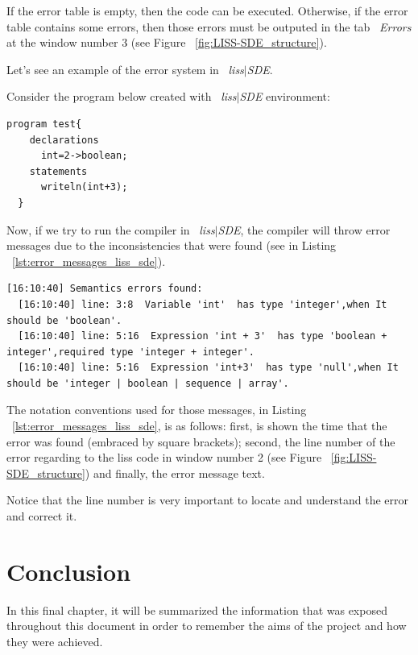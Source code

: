 \documentclass[
  oneside,
  11pt, a4paper,
  footinclude=true,
  headinclude=true,
  cleardoublepage=empty
]{scrbook}
\begin{document}
If the error table is empty, then the code can be executed. Otherwise, if the error table contains some errors, then those errors must be outputed in the tab ~\textit{Errors} at the window number 3 (see Figure ~\ref{fig:LISS-SDE_structure}).

Let's see an example of the error system in ~\textit{liss$|$SDE}.

Consider the program below created with ~\textit{liss$|$SDE} environment:

\begin{lstlisting}[caption={Example of a liss code that isn't semantically correct},label={lst:error_semantic_liss_sde_example}]
  program test{
    declarations
      int=2->boolean;
    statements
      writeln(int+3);
  }
\end{lstlisting}

Now, if we try to run the compiler in ~\textit{liss$|$SDE}, the compiler will throw error messages due to the inconsistencies that were found (see in Listing ~\ref{lst:error_messages_liss_sde}).

\begin{lstlisting}[caption={Error messages in ~\textit{liss$|$SDE}},label={lst:error_messages_liss_sde}]
  [16:10:40] Semantics errors found:
  [16:10:40] line: 3:8  Variable 'int'  has type 'integer',when It should be 'boolean'.
  [16:10:40] line: 5:16  Expression 'int + 3'  has type 'boolean + integer',required type 'integer + integer'.
  [16:10:40] line: 5:16  Expression 'int+3'  has type 'null',when It should be 'integer | boolean | sequence | array'.
\end{lstlisting}
 
The notation conventions used for those messages, in Listing ~\ref{lst:error_messages_liss_sde}, is as follows: first, is shown the time that the error was found (embraced by square brackets); second, the line number of the error regarding to the liss code in window number 2 (see Figure ~\ref{fig:LISS-SDE_structure}) and finally, the error message text.

Notice that the line number is very important to locate and understand the error and correct it.


\chapter{Conclusion}

In this final chapter, it will be summarized the information that was exposed throughout this document in order to remember the aims of the project and how they were achieved.
\end{document}
